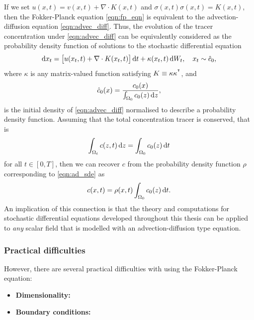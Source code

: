 If we set \(u\!\left(x,t\right) = v\!\left(x,t\right) + \nabla \cdot K\!\left(x,t\right)\) and \(\sigma\!\left(x,t\right)\sigma\!\left(x,t\right) = K\!\left(x,t\right)\), then the Fokker-Planck equation \cref{eqn:fp_eqn} is equivalent to the advection-diffusion equation \eqref{eqn:advec_diff}.
Thus, the evolution of the tracer concentration under \cref{eqn:advec_diff} can be equivalently considered as the probability density function of solutions to the stochastic differential equation
\begin{equation}\label{eqn:ad_sde}
	\dif x_t = \left[u\!\left(x_t, t\right) + \nabla \cdot K\!\left(x_t, t\right)\right]\dif t + \kappa\!\left(x_t, t\right)\dif W_t, \quad x_t \sim \hat{c}_0,
\end{equation}
where \(\kappa\) is any matrix-valued function satisfying \(K \equiv \kappa\kappa^{^{\intercal}}\), and
\[
	\hat{c}_0\!\left(x\right) = \frac{c_0\!\left(x\right)}{\int_{\Omega_0}c_0\!\left(z\right)\dif z},
\]
is the initial density of \eqref{eqn:advec_diff} normalised to describe a probability density function.
Assuming that the total concentration tracer is conserved, that is
\[
	\int_{\Omega_t}{c\!\left(z,t\right)\dif z} = \int_{\Omega_0}{c_0\!\left(z\right)\dif t}
\]
for all \(t \in [0,T]\), then we can recover \(c\) from the probability density function \(\rho\) corresponding to \cref{eqn:ad_sde} as
\[
	c\!\left(x,t\right) = \rho\!\left(x,t\right)\int_{\Omega_0}{c_0\!\left(z\right)\dif t}.
\]
An implication of this connection is that the theory and computations for stochastic differential equations developed throughout this thesis can be applied to \emph{any} scalar field that is modelled with an advection-diffusion type equation.



\subsubsection{Practical difficulties}

However, there are several practical difficulties with using the Fokker-Planck equation:
\begin{itemize}
	\item \textbf{Dimensionality:}
	\item \textbf{Boundary conditions:}
\end{itemize}



